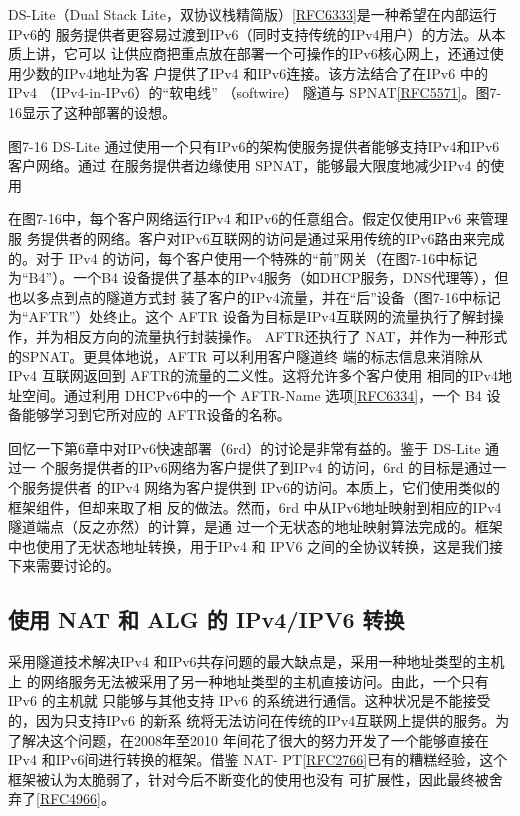 DS-Lite（Dual Stack Lite，双协议栈精简版）\href{https://www.rfc-editor.org/rfc/rfc6333}{[RFC6333]}是一种希望在内部运行IPv6的
服务提供者更容易过渡到IPv6（同时支持传统的IPv4用户）的方法。从本质上讲，它可以
让供应商把重点放在部署一个可操作的IPv6核心网上，还通过使用少数的IPv4地址为客
户提供了IPv4 和IPv6连接。该方法结合了在IPv6 中的IPv4 （IPv4-in-IPv6）的“软电线”
（softwire） 隧道与 SPNAT\href{https://www.rfc-editor.org/rfc/rfc5571}{[RFC5571]}。图7-16显示了这种部署的设想。

图7-16
DS-Lite 通过使用一个只有IPv6的架构使服务提供者能够支持IPv4和IPv6 客户网络。通过
在服务提供者边缘使用 SPNAT，能够最大限度地减少IPv4 的使用

在图7-16中，每个客户网络运行IPv4 和IPv6的任意组合。假定仅使用IPv6 来管理服
务提供者的网络。客户对IPv6互联网的访问是通过采用传统的IPv6路由来完成的。对于
IPv4 的访问，每个客户使用一个特殊的“前”网关（在图7-16中标记为“B4”）。一个B4
设备提供了基本的IPv4服务（如DHCP服务，DNS代理等），但也以多点到点的隧道方式封
装了客户的IPv4流量，并在“后”设备（图7-16中标记为“AFTR”）处终止。这个 AFTR
设备为目标是IPv4互联网的流量执行了解封操作，并为相反方向的流量执行封装操作。
AFTR还执行了 NAT，并作为一种形式的SPNAT。更具体地说，AFTR 可以利用客户隧道终
端的标志信息来消除从 IPv4 互联网返回到 AFTR的流量的二义性。这将允许多个客户使用
相同的IPv4地址空间。通过利用 DHCPv6中的一个 AFTR-Name 选项\href{https://www.rfc-editor.org/rfc/rfc6334}{[RFC6334]}，一个 B4
设备能够学习到它所对应的 AFTR设备的名称。

回忆一下第6章中对IPv6快速部署（6rd）的讨论是非常有益的。鉴于 DS-Lite 通过一
个服务提供者的IPv6网络为客户提供了到IPv4 的访问，6rd 的目标是通过一个服务提供者
的IPv4 网络为客户提供到 IPv6的访问。本质上，它们使用类似的框架组件，但却来取了相
反的做法。然而，6rd 中从IPv6地址映射到相应的IPv4 隧道端点（反之亦然）的计算，是通
过一个无状态的地址映射算法完成的。框架中也使用了无状态地址转换，用于IPv4 和 IPV6
之间的全协议转换，这是我们接下来需要讨论的。

\subsection{使用 NAT 和 ALG 的 IPv4/IPV6 转换}

采用隧道技术解决IPv4 和IPv6共存问题的最大缺点是，采用一种地址类型的主机上
的网络服务无法被采用了另一种地址类型的主机直接访问。由此，一个只有IPv6 的主机就
只能够与其他支持 IPv6 的系统进行通信。这种状况是不能接受的，因为只支持IPv6 的新系
统将无法访问在传统的IPv4互联网上提供的服务。为了解决这个问题，在2008年至2010
年间花了很大的努力开发了一个能够直接在IPv4 和IPv6间进行转换的框架。借鉴 NAT-
PT\href{https://www.rfc-editor.org/rfc/rfc2766}{[RFC2766]}已有的糟糕经验，这个框架被认为太脆弱了，针对今后不断变化的使用也没有
可扩展性，因此最终被舍弃了\href{https://www.rfc-editor.org/rfc/rfc4966}{[RFC4966]}。

